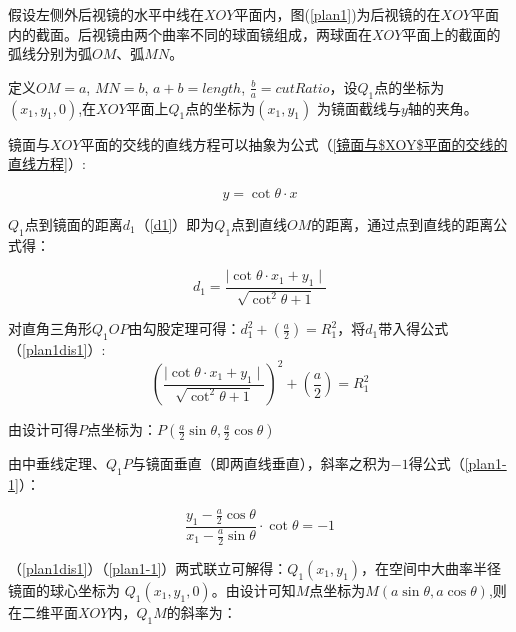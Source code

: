 \documentclass[withoutpreface,bwprint]{cumcmthesis} %
\begin{document}
\par 假设左侧外后视镜的水平中线在$XOY$平面内，图(\ref{plan1})为后视镜的在$XOY$平面内的截面。后视镜由两个曲率不同的球面镜组成，两球面在$XOY$平面上的截面的弧线分别为弧$OM$、弧$MN$。

\par 定义$OM = a$, $MN = b$, $a + b = length$, $\frac{b}{a} = cutRatio$，设$Q_1$点的坐标为$(x_1,y_1,0)$,在$XOY$平面上$Q_1$点的坐标为$(x_1,y_1)$ 为镜面截线与$y$轴的夹角。

\par 镜面与$XOY$平面的交线的直线方程可以抽象为公式（\ref{镜面与$XOY$平面的交线的直线方程}）:
 
\begin{equation}
\label{镜面与$XOY$平面的交线的直线方程}
	y = \mathop{cot}\theta \cdot x
\end{equation}

$Q_1$点到镜面的距离$d_1$（\ref{d1}）即为$Q_1$点到直线$OM$的距离，通过点到直线的距离公式得：

\begin{equation}
\label{d1}
	d_1 = \frac{\mid \mathop{cot}\theta \cdot x_1 + y_1 \mid}{\sqrt{\mathop{cot}^{2} \theta + 1}} 
\end{equation}

\par 对直角三角形$Q_1OP$由勾股定理可得：$ d_1^2 + \left( \frac{a}{2} \right) = R_1^2$，将$d_1$带入得公式（\ref{plan1dis1}）:
\begin{equation}
\label{plan1dis1}
	\left( \frac{\mid \mathop{cot}\theta \cdot x_1 + y_1 \mid}{\sqrt{\mathop{cot}^{2} \theta + 1}} \right)^2 +\left( \frac{a}{2} \right) = R_1^2
\end{equation}

\par 由设计可得$P$点坐标为：$P(\frac{a}{2} \mathop{sin} \theta, \frac{a}{2} \mathop{cos} \theta)$

\par 由中垂线定理、$Q_1P$与镜面垂直（即两直线垂直），斜率之积为$-1$得公式（\ref{plan1-1}）：

\begin{equation}
\label{plan1-1}
	\frac{y_1 - \frac{a}{2} \mathop{cos} \theta}{x_1 - \frac{a}{2} \mathop{sin} \theta} \cdot \mathop{cot}\theta = -1
\end{equation}

\par （\ref{plan1dis1}）（\ref{plan1-1}）两式联立可解得：$Q_1(x_1,y_1)$，在空间中大曲率半径镜面的球心坐标为 $Q_1(x_1,y_1,0)$。由设计可知$M$点坐标为$M(a \mathop{sin} \theta, a \mathop{cos} \theta)$,则在二维平面$XOY$内，$Q_1M$的斜率为：
\end{document}
